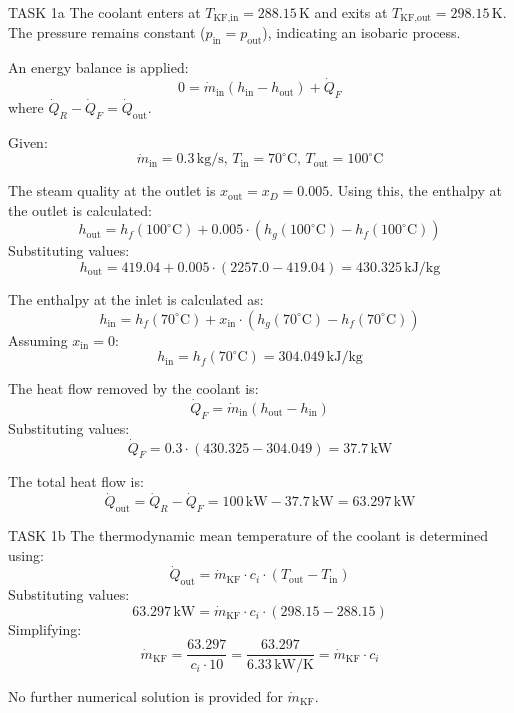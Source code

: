 TASK 1a  
The coolant enters at \( T_{\text{KF,in}} = 288.15 \, \text{K} \) and exits at \( T_{\text{KF,out}} = 298.15 \, \text{K} \). The pressure remains constant (\( p_{\text{in}} = p_{\text{out}} \)), indicating an isobaric process.  

An energy balance is applied:  
\[
0 = \dot{m}_{\text{in}} (h_{\text{in}} - h_{\text{out}}) + \dot{Q}_F
\]  
where \( \dot{Q}_R - \dot{Q}_F = \dot{Q}_{\text{out}} \).  

Given:  
\[
\dot{m}_{\text{in}} = 0.3 \, \text{kg/s}, \, T_{\text{in}} = 70^\circ\text{C}, \, T_{\text{out}} = 100^\circ\text{C}
\]  

The steam quality at the outlet is \( x_{\text{out}} = x_D = 0.005 \). Using this, the enthalpy at the outlet is calculated:  
\[
h_{\text{out}} = h_f(100^\circ\text{C}) + 0.005 \cdot (h_g(100^\circ\text{C}) - h_f(100^\circ\text{C}))
\]  
Substituting values:  
\[
h_{\text{out}} = 419.04 + 0.005 \cdot (2257.0 - 419.04) = 430.325 \, \text{kJ/kg}
\]  

The enthalpy at the inlet is calculated as:  
\[
h_{\text{in}} = h_f(70^\circ\text{C}) + x_{\text{in}} \cdot (h_g(70^\circ\text{C}) - h_f(70^\circ\text{C}))
\]  
Assuming \( x_{\text{in}} = 0 \):  
\[
h_{\text{in}} = h_f(70^\circ\text{C}) = 304.049 \, \text{kJ/kg}
\]  

The heat flow removed by the coolant is:  
\[
\dot{Q}_F = \dot{m}_{\text{in}} (h_{\text{out}} - h_{\text{in}})
\]  
Substituting values:  
\[
\dot{Q}_F = 0.3 \cdot (430.325 - 304.049) = 37.7 \, \text{kW}
\]  

The total heat flow is:  
\[
\dot{Q}_{\text{out}} = \dot{Q}_R - \dot{Q}_F = 100 \, \text{kW} - 37.7 \, \text{kW} = 63.297 \, \text{kW}
\]  

TASK 1b  
The thermodynamic mean temperature of the coolant is determined using:  
\[
\dot{Q}_{\text{out}} = \dot{m}_{\text{KF}} \cdot c_i \cdot (T_{\text{out}} - T_{\text{in}})
\]  
Substituting values:  
\[
63.297 \, \text{kW} = \dot{m}_{\text{KF}} \cdot c_i \cdot (298.15 - 288.15)
\]  
Simplifying:  
\[
\dot{m}_{\text{KF}} = \frac{63.297}{c_i \cdot 10} = \frac{63.297}{6.33 \, \text{kW/K}} = \dot{m}_{\text{KF}} \cdot c_i
\]  

No further numerical solution is provided for \( \dot{m}_{\text{KF}} \).